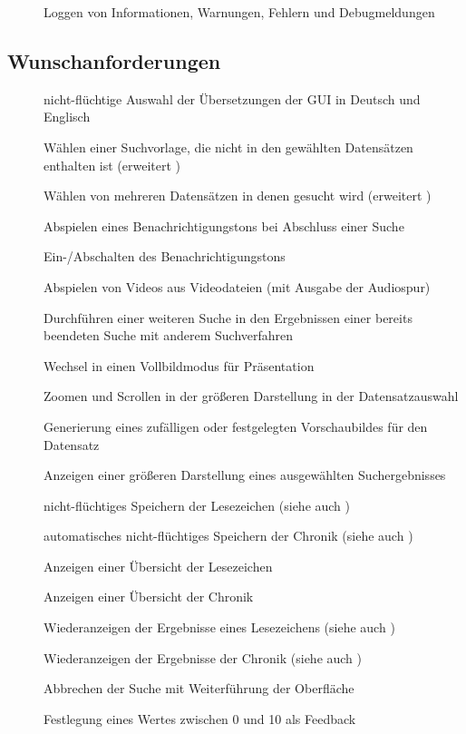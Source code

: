 \begin{description}
	\item[] Loggen von Informationen, Warnungen, Fehlern und Debugmeldungen
	 
\end{description}

\subsection{Wunschanforderungen}
\begin{description}
	\item[] nicht-flüchtige Auswahl der Übersetzungen der \gls{GUI} in Deutsch und Englisch
	\newline
	\item[] Wählen einer Suchvorlage, die nicht in den gewählten Datensätzen enthalten ist (erweitert )
	\item[] Wählen von mehreren Datensätzen in denen gesucht wird (erweitert )
	\newline
	\item[] Abspielen eines Benachrichtigungstons bei Abschluss einer Suche
	\item[] Ein-/Abschalten des Benachrichtigungstons
	\item[] Abspielen von Videos aus Videodateien (mit Ausgabe der Audiospur)
	\item[] Durchführen einer weiteren Suche in den Ergebnissen einer bereits beendeten Suche mit anderem Suchverfahren 
	\newline
	\item[] Wechsel in einen Vollbildmodus für Präsentation
	
	\item[] Zoomen und Scrollen in der größeren Darstellung in der Datensatzauswahl
	\item[] Generierung eines zufälligen oder festgelegten Vorschaubildes für den Datensatz
	\item[] Anzeigen einer größeren Darstellung eines ausgewählten Suchergebnisses
	
	\item[] nicht-flüchtiges Speichern der Lesezeichen (siehe auch )
	\item[] automatisches nicht-flüchtiges Speichern der Chronik (siehe auch )
	\item[] Anzeigen einer Übersicht der Lesezeichen
	\item[] Anzeigen einer Übersicht der Chronik
	\item[] Wiederanzeigen der Ergebnisse eines Lesezeichens (siehe auch )
	\item[] Wiederanzeigen der Ergebnisse der Chronik (siehe auch )
	
	\item[] Abbrechen der Suche mit Weiterführung der Oberfläche
	\item[] Festlegung eines Wertes zwischen 0 und 10 als Feedback
\end{description}
\pagebreak
